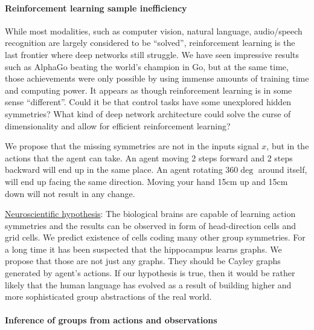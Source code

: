 \documentclass[12pt]{article}
\begin{document}
\paragraph{Reinforcement learning sample inefficiency}
While most modalities, such as computer vision, natural language, audio/speech recognition are largely considered to be ``solved'', reinforcement learning is the last frontier where deep networks still struggle. We have seen impressive results such as AlphaGo beating the world's champion in Go, but at the same time, those achievements were only possible by using immense amounts of training time and computing power. It appears as though reinforcement learning is in some sense ``different''. Could it be that control tasks have some unexplored hidden symmetries? What kind of deep network architecture could solve the curse of dimensionality and allow for efficient reinforcement learning?

We propose that the missing symmetries are not in the inputs signal $x$, but in the actions that the agent can take. An agent moving 2 steps forward and 2 steps backward will end up in the same place. An agent rotating $360\deg$ around itself, will end up facing the same direction. Moving your hand 15cm up and 15cm down will not result in any change. 

\underline{Neuroscientific hypothesis}: The biological brains are capable of learning action symmetries and the results can be observed in form of head-direction cells and grid cells. We predict existence of cells coding many other group symmetries. For a long time it has been suspected that the hippocampus learns graphs. We propose that those are not just any graphs. They should be Cayley graphs generated by agent's actions. If our hypothesis is true, then it would be rather likely that the human language has evolved as a result of building higher and more sophisticated group abstractions of the real world. 

\paragraph{Inference of groups from actions and observations}
\end{document}
